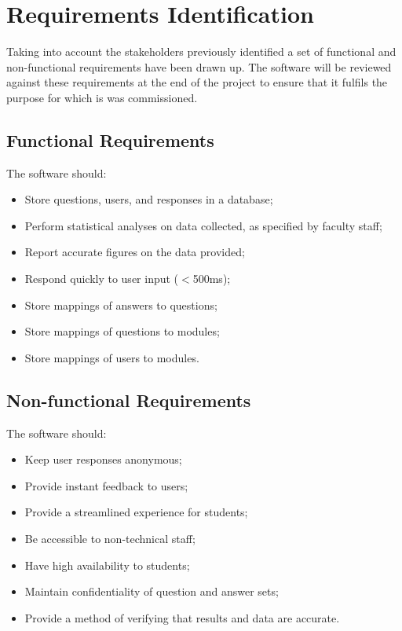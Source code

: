 \documentclass[12pt,a4paper,twoside]{report}
\begin{document}
\section{Requirements Identification}
Taking into account the stakeholders previously identified a set of functional and non-functional requirements have been drawn up. The software will be reviewed against these requirements at the end of the project to ensure that it fulfils the purpose for which is was commissioned.

\subsection{Functional Requirements}
The software should:
\begin{itemize}
	\item Store questions, users, and responses in a database;
	\item Perform statistical analyses on data collected, as specified by faculty staff;
	\item Report accurate figures on the data provided;
	\item Respond quickly to user input ($<$500ms);
	\item Store mappings of answers to questions;
	\item Store mappings of questions to modules;
	\item Store mappings of users to modules.
\end{itemize}
\subsection{Non-functional Requirements}
The software should:
\begin{itemize}
	\item Keep user responses anonymous;
	\item Provide instant feedback to users;
	\item Provide a streamlined experience for students;
	\item Be accessible to non-technical staff;
	\item Have high availability to students;
	\item Maintain confidentiality of question and answer sets;
	\item Provide a method of verifying that results and data are accurate.
\end{itemize}
\end{document}
